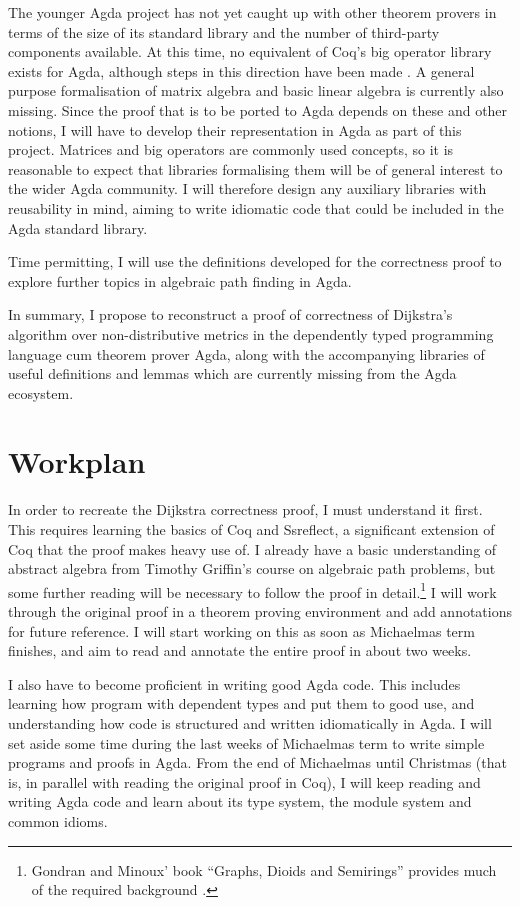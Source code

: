 \documentclass[a4paper]{scrartcl}
\begin{document}
The younger Agda project has not yet caught up with other theorem provers in terms of the size of its standard library and the number of third-party components available. At this time, no equivalent of Coq's big operator library exists for Agda, although steps in this direction have been made \autocite{gustafsson_foldable_2014}. A general purpose formalisation of matrix algebra and basic linear algebra is currently also missing. Since the proof that is to be ported to Agda depends on these and other notions, I will have to develop their representation in Agda as part of this project. Matrices and big operators are commonly used concepts, so it is reasonable to expect that libraries formalising them will be of general interest to the wider Agda community. I will therefore design any auxiliary libraries with reusability in mind, aiming to write idiomatic code that could be included in the Agda standard library.

Time permitting, I will use the definitions developed for the correctness proof to explore further topics in algebraic path finding in Agda.

In summary, I propose to reconstruct a proof of correctness of Dijkstra's algorithm over non-distributive metrics in the dependently typed programming language cum theorem prover Agda, along with the accompanying libraries of useful definitions and lemmas which are currently missing from the Agda ecosystem.

\section{Workplan%
  \label{workplan}%
}

In order to recreate the Dijkstra correctness proof, I must understand it first. This requires learning the basics of Coq and Ssreflect, a significant extension of Coq that the proof makes heavy use of. I already have a basic understanding of abstract algebra from Timothy Griffin's course on algebraic path problems, but some further reading will be necessary to follow the proof in detail.\footnote{Gondran and Minoux' book \enquote{Graphs, Dioids and Semirings} provides much of the required background \autocite{gondran_graphs_2008}.} I will work through the original proof in a theorem proving environment and add annotations for future reference. I will start working on this as soon as Michaelmas term finishes, and aim to read and annotate the entire proof in about two weeks.

I also have to become proficient in writing good Agda code. This includes learning how program with dependent types and put them to good use, and understanding how code is structured and written idiomatically in Agda. I will set aside some time during the last weeks of Michaelmas term to write simple programs and proofs in Agda. From the end of Michaelmas until Christmas (that is, in parallel with reading the original proof in Coq), I will keep reading and writing Agda code and learn about its type system, the module system and common idioms.
\end{document}
